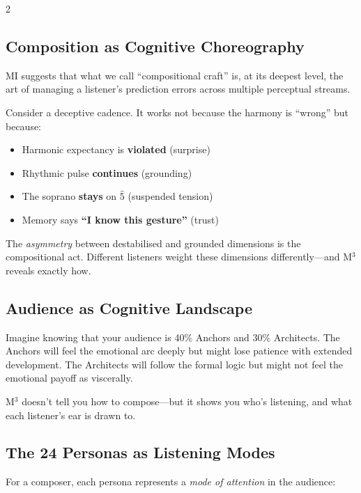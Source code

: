 \documentclass[10pt,a4paper]{article}
\begin{document}
\begin{multicols}{2}

\subsection{Composition as Cognitive Choreography}

MI suggests that what we call ``compositional craft'' is, at its deepest level, the art of managing a listener's prediction errors across multiple perceptual streams.

\smallskip
Consider a deceptive cadence. It works not because the harmony is ``wrong'' but because:
\begin{itemize}[itemsep=2pt]
  \item Harmonic expectancy is \textbf{violated} (surprise)
  \item Rhythmic pulse \textbf{continues} (grounding)
  \item The soprano \textbf{stays} on $\hat{5}$ (suspended tension)
  \item Memory says \textbf{``I know this gesture''} (trust)
\end{itemize}

The \emph{asymmetry} between destabilised and grounded dimensions is the compositional act. Different listeners weight these dimensions differently---and M$^3$ reveals exactly how.

\subsection{Audience as Cognitive Landscape}

Imagine knowing that your audience is 40\% Anchors and 30\% Architects. The Anchors will feel the emotional arc deeply but might lose patience with extended development. The Architects will follow the formal logic but might not feel the emotional payoff as viscerally.

\smallskip
M$^3$ doesn't tell you how to compose---but it shows you who's listening, and what each listener's ear is drawn to.

\columnbreak

\subsection{The 24 Personas as Listening Modes}

For a composer, each persona represents a \emph{mode of attention} in the audience:


\end{multicols}
\end{document}
